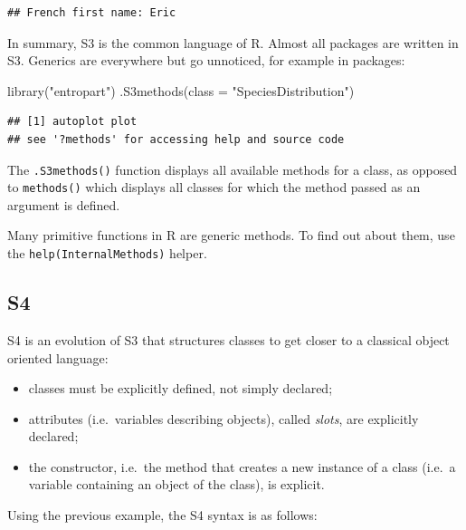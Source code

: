 \documentclass[
  12pt,
  american,
  a4paper,
  extrafontsizes,onecolumn,openright
  ]{memoir}
\newenvironment{Shaded}{\begin{snugshade}}{\end{snugshade}}
\newcommand{\AttributeTok}[1]{\textcolor[rgb]{0.77,0.63,0.00}{#1}}
\newcommand{\FunctionTok}[1]{\textcolor[rgb]{0.00,0.00,0.00}{#1}}
\newcommand{\NormalTok}[1]{#1}
\newcommand{\StringTok}[1]{\textcolor[rgb]{0.31,0.60,0.02}{#1}}
\providecommand{\tightlist}{%
  \setlength{\itemsep}{0pt}\setlength{\parskip}{0pt}}
\begin{document}
\begin{verbatim}
## French first name: Eric
\end{verbatim}

\normalsize

In summary, S3 is the common language of R.
Almost all packages are written in S3.
Generics are everywhere but go unnoticed, for example in packages:

\scriptsize

\begin{Shaded}
\begin{Highlighting}[]
\FunctionTok{library}\NormalTok{(}\StringTok{"entropart"}\NormalTok{)}
\FunctionTok{.S3methods}\NormalTok{(}\AttributeTok{class =} \StringTok{"SpeciesDistribution"}\NormalTok{)}
\end{Highlighting}
\end{Shaded}

\begin{verbatim}
## [1] autoplot plot    
## see '?methods' for accessing help and source code
\end{verbatim}

\normalsize

The \texttt{.S3methods()} function displays all available methods for a class, as opposed to \texttt{methods()} which displays all classes for which the method passed as an argument is defined.

Many primitive functions in R are generic methods.
To find out about them, use the \texttt{help(InternalMethods)} helper.

\hypertarget{s4}{%
\subsection{S4}\label{s4}}

S4 is an evolution of S3 that structures classes to get closer to a classical object oriented language:

\begin{itemize}
\tightlist
\item
  classes must be explicitly defined, not simply declared;
\item
  attributes (i.e.~variables describing objects), called \emph{slots}, are explicitly declared;
\item
  the constructor, i.e.~the method that creates a new instance of a class (i.e.~a variable containing an object of the class), is explicit.
\end{itemize}

Using the previous example, the S4 syntax is as follows:
\end{document}

